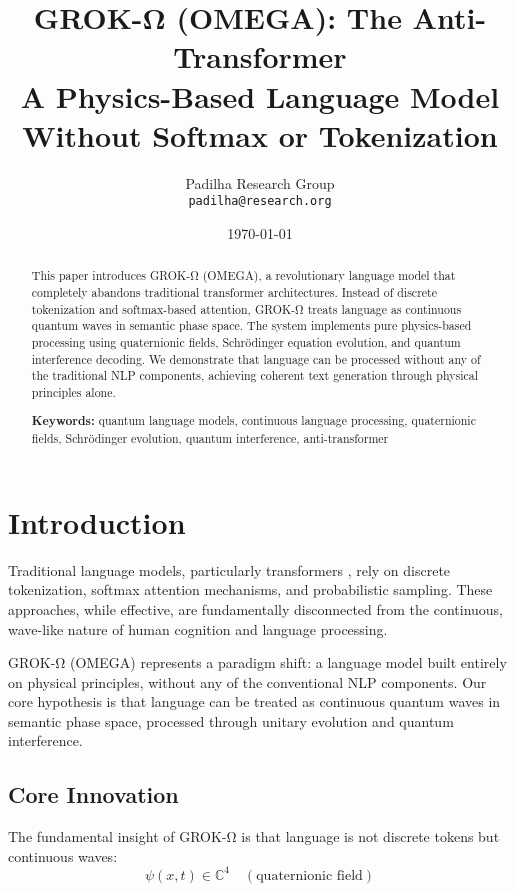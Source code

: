 \documentclass[11pt,a4paper]{article}
\title{GROK-Ω (OMEGA): The Anti-Transformer\\A Physics-Based Language Model Without Softmax or Tokenization}
\author{
    Padilha Research Group\\
    \texttt{padilha@research.org}
}
\date{\today}
\begin{document}
\maketitle

\begin{abstract}
This paper introduces GROK-Ω (OMEGA), a revolutionary language model that completely abandons traditional transformer architectures. Instead of discrete tokenization and softmax-based attention, GROK-Ω treats language as continuous quantum waves in semantic phase space. The system implements pure physics-based processing using quaternionic fields, Schrödinger equation evolution, and quantum interference decoding. We demonstrate that language can be processed without any of the traditional NLP components, achieving coherent text generation through physical principles alone.

\textbf{Keywords:} quantum language models, continuous language processing, quaternionic fields, Schrödinger evolution, quantum interference, anti-transformer
\end{abstract}

\section{Introduction}

Traditional language models, particularly transformers \cite{vaswani2017attention}, rely on discrete tokenization, softmax attention mechanisms, and probabilistic sampling. These approaches, while effective, are fundamentally disconnected from the continuous, wave-like nature of human cognition and language processing.

GROK-Ω (OMEGA) represents a paradigm shift: a language model built entirely on physical principles, without any of the conventional NLP components. Our core hypothesis is that language can be treated as continuous quantum waves in semantic phase space, processed through unitary evolution and quantum interference.

\subsection{Core Innovation}

The fundamental insight of GROK-Ω is that language is not discrete tokens but continuous waves:
\begin{equation}
\psi(x,t) \in \mathbb{C}^4 \quad (\text{quaternionic field})
\end{equation}
\end{document}
